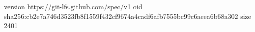 version https://git-lfs.github.com/spec/v1
oid sha256:cb2e7a746d3523fb8f1559f432cf9674a4cadf6afb7555bc99c6aeea6b68a302
size 2401

